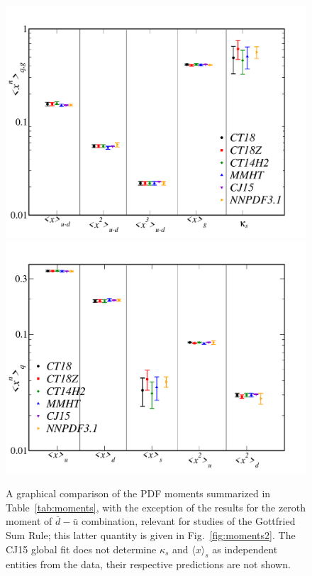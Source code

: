 \begin{figure}
\includegraphics[scale=0.29]{./fig/mom-comps_v3.pdf}
\includegraphics[scale=0.29]{./fig/mom-comps_FS_v2.pdf}
%
\caption{
	A graphical comparison of the PDF moments summarized in Table~\ref{tab:moments}, with the exception of the
	results for the zeroth moment of $\bar{d}-\bar{u}$ combination, relevant for studies of the
	Gottfried Sum Rule; this latter quantity is given in
        Fig.~\ref{fig:moments2}. The CJ15 global fit does not
        determine $\kappa_s$ and $\langle x \rangle_{s}$ as
        independent entities from the data, their respective
        predictions are not shown. 
}
\label{fig:moments1}
\end{figure}
%


